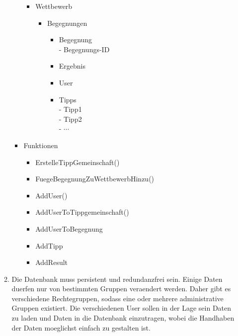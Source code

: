 \documentclass{article}
\begin{document}
\begin{enumerate}
\begin{enumerate}
\begin{itemize}
\begin{itemize}
                                \item Wettbewerb
                                    \begin{itemize}
                                         \item Begegnungen
                                            \begin{itemize}
                                                \item Begegnung\\
                                                    - Begegnungs-ID
                                                \item Ergebnis
                                                \item User
                                                \item Tipps\\
                                                    - Tipp1\\
                                                    - Tipp2\\
                                                    - $\cdots$
                                            \end{itemize}
                                     \end{itemize}
                            \end{itemize}
                        \item Funktionen
                            \begin{itemize}
                                \item ErstelleTippGemeinschaft()
                                \item FuegeBegegnungZuWettbewerbHinzu()
                                \item AddUser()
                                \item AddUserToTippgemeinschaft()
                                \item AddUserToBegegnung
                                \item AddTipp
                                \item AddResult
                            \end{itemize}
                   \end{itemize}
               \item Die Datenbank muss persistent und redundanzfrei sein. Einige Daten duerfen nur von bestimmten Gruppen veraendert werden. Daher gibt es verschiedene Rechtegruppen, sodass eine oder mehrere administrative Gruppen existiert. Die verschiedenen User sollen in der Lage sein Daten zu laden und Daten in die Datenbank einzutragen, wobei die Handhaben der Daten moeglichst einfach zu gestalten ist. 

\end{enumerate}
\end{enumerate}
\end{document}
